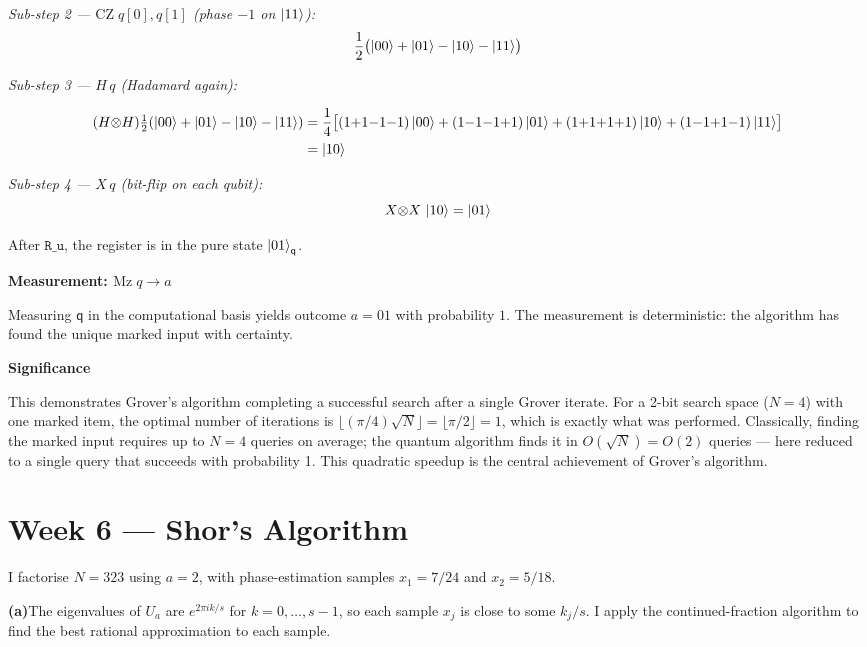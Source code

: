 \documentclass[12pt,a4paper]{article}
\begin{document}
\textit{Sub-step 2 --- $\mathrm{CZ}\;q[0],q[1]$ (phase $-1$ on $\ket{11}$):}
\[
  \frac{1}{2}\bigl(\ket{00}+\ket{01}-\ket{10}-\ket{11}\bigr)
\]

\textit{Sub-step 3 --- $H\,q$ (Hadamard again):}

\begin{align*}
(H{\otimes}H)\tfrac{1}{2}(\ket{00}+\ket{01}-\ket{10}-\ket{11})
  &= \frac{1}{4}\bigl[(1{+}1{-}1{-}1)\ket{00}+(1{-}1{-}1{+}1)\ket{01}
     +(1{+}1{+}1{+}1)\ket{10}+(1{-}1{+}1{-}1)\ket{11}\bigr] \\
  &= \ket{10}
\end{align*}

\textit{Sub-step 4 --- $X\,q$ (bit-flip on each qubit):}
\[
  X{\otimes}X\,\ket{10} = \ket{01}
\]

After $\mathtt{R\_u}$, the register is in the pure state $\ket{01}_{\mathsf{q}}$.

\medskip
\textbf{Measurement: $\mathrm{Mz}\;q\to a$}

\medskip
Measuring $\mathsf{q}$ in the computational basis yields outcome $a=01$ with probability $1$.
The measurement is deterministic: the algorithm has found the unique marked input with certainty.

\medskip
\textbf{Significance}

\medskip
This demonstrates Grover's algorithm completing a successful search after a single Grover iterate.
For a 2-bit search space ($N=4$) with one marked item, the optimal number of iterations is
$\lfloor(\pi/4)\sqrt{N}\rfloor = \lfloor\pi/2\rfloor = 1$, which is exactly what was performed.
Classically, finding the marked input requires up to $N=4$ queries on average; the quantum algorithm
finds it in $O(\sqrt{N})=O(2)$ queries — here reduced to a single query that succeeds with probability 1.
This quadratic speedup is the central achievement of Grover's algorithm.

\section*{Week 6 --- Shor's Algorithm}

I factorise $N=323$ using $a=2$, with phase-estimation samples
$x_1=7/24$ and $x_2=5/18$.

\medskip
\noindent\textbf{(a)}\enspace The eigenvalues of $U_a$ are $e^{2\pi i k/s}$ for $k=0,\ldots,s-1$,
so each sample $x_j$ is close to some $k_j/s$.
I apply the continued-fraction algorithm to find the best rational approximation to each sample.
\end{document}
